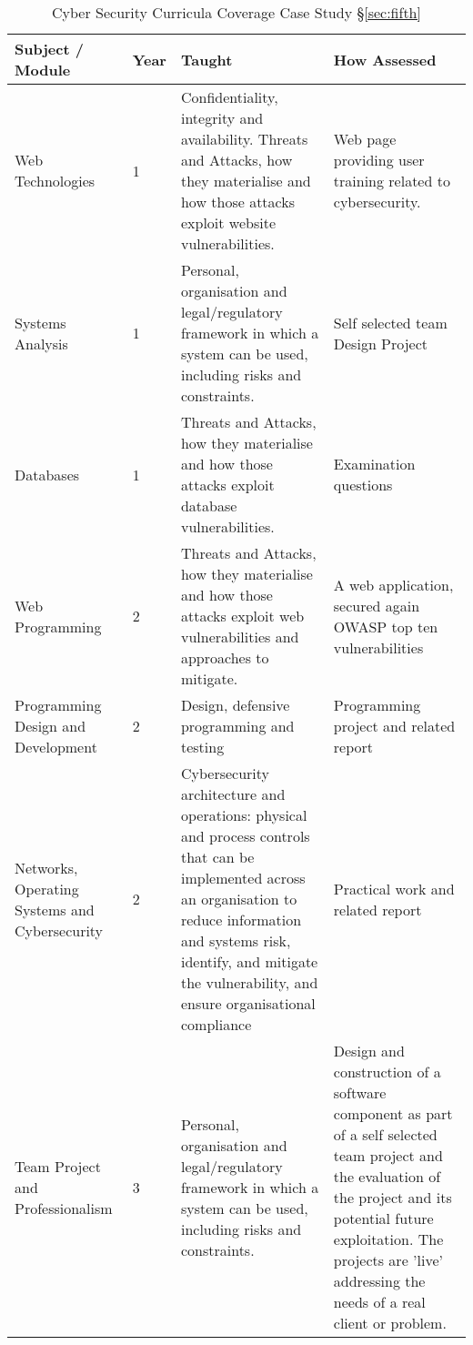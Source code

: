 \documentclass[conference]{IEEEtran}
\begin{document}
\begin{table*}[ht]
	\caption{Cyber Security Curricula Coverage Case Study \S\ref{sec:fifth}\label{tab:CaseStudy5}}{%
		\begin{tabular}{p{3cm} p{0.6cm} p{6.5cm} p{6.3cm}}
			\toprule
			Subject / Module & Year & Taught & How Assessed \\
			\midrule
			Web Technologies & 1 & Confidentiality, integrity and availability. Threats and Attacks, how they materialise and how those attacks exploit website vulnerabilities. & Web page providing user training related to cybersecurity. \\
			\midrule
			Systems Analysis & 1 & Personal, organisation and legal/regulatory framework in which a system can be used, including risks and constraints. & Self selected team Design Project \\
			\midrule
			Databases & 1 & Threats and Attacks, how they materialise and how those attacks exploit database vulnerabilities. & Examination questions\\
			\midrule
			Web Programming & 2 & Threats and Attacks, how they materialise and how those attacks exploit web vulnerabilities and approaches to mitigate. & A web application, secured again OWASP top ten vulnerabilities \\
			\midrule
			Programming Design and Development & 2 & Design, defensive programming and testing & Programming project and related report\\
			\midrule
			Networks, Operating Systems and Cybersecurity & 2 & Cybersecurity architecture and operations: physical and process controls that can be implemented across an organisation to reduce information and systems risk, identify, and mitigate the vulnerability, and ensure organisational compliance & Practical work and related report\\
			\midrule
			Team Project and Professionalism & 3 & Personal, organisation and legal/regulatory framework in which a system can be used, including risks and constraints. & Design and construction of a software component as part of a self selected team project and the evaluation of the project and its potential future exploitation. The projects are 'live' addressing the needs of a real client or problem.\\%
\bottomrule%
\end{tabular}%
	}
\end{table*}
\end{document}
